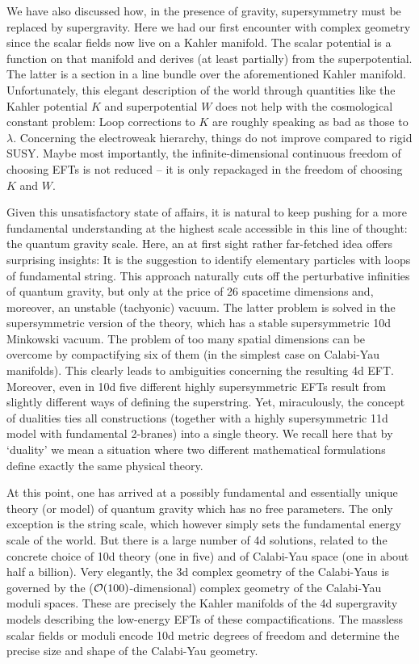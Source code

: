 \documentclass[12pt]{article}
\numberwithin{equation}{section}
\begin{document}
We have also discussed how, in the presence of gravity, supersymmetry must be replaced by supergravity. Here we had our first encounter with complex geometry since the scalar fields now live on a Kahler manifold. The scalar potential is a function on that manifold and derives (at least partially) from the superpotential. The latter is a section in a line bundle over the aforementioned Kahler manifold. Unfortunately, this elegant description of the world through quantities like the Kahler potential $K$ and superpotential $W$ does not help with the cosmological constant problem: Loop corrections to $K$ are roughly speaking as bad as those to $\lambda$. Concerning the electroweak hierarchy, things do not improve compared to rigid SUSY.
Maybe most importantly, the infinite-dimensional continuous freedom of choosing EFTs is not reduced -- it is only repackaged in the freedom of choosing $K$ and $W$.

Given this unsatisfactory state of affairs, it is natural to keep pushing for a more fundamental understanding at the highest scale accessible in this line of thought: the quantum gravity scale. Here, an at first sight rather far-fetched idea offers surprising insights: It is the suggestion to identify elementary particles with loops of fundamental string. This approach naturally cuts off the perturbative infinities of quantum gravity, but only at the price of 26 spacetime dimensions and, moreover, an unstable (tachyonic) vacuum. The latter problem is solved in the supersymmetric version of the theory, which has a stable supersymmetric 10d Minkowski vacuum. The problem of too many spatial dimensions can be overcome by compactifying six of them (in the simplest case on Calabi-Yau manifolds). This clearly leads to ambiguities concerning the resulting 4d EFT. Moreover, even in 10d five different highly supersymmetric EFTs result from slightly different ways of defining the superstring. Yet, miraculously, the concept of dualities ties all constructions (together with a highly supersymmetric 11d model with fundamental 2-branes) into a single theory.
We recall here that by `duality' we mean a situation where two different mathematical formulations define exactly the same physical theory.

At this point, one has arrived at a possibly fundamental and essentially unique theory (or model) of quantum gravity which has no free parameters. The only exception is the string scale, which however simply sets the fundamental energy scale of the world. But there is a large number of 4d solutions, related to the concrete choice of 10d theory (one in five) and of Calabi-Yau space (one in about half a billion). Very elegantly, the 3d complex geometry of the Calabi-Yaus is governed by the (${\cal O}(100)$-dimensional) complex geometry of the Calabi-Yau moduli spaces. These are precisely the Kahler manifolds of the 4d supergravity models describing the low-energy EFTs of these compactifications. The massless scalar fields or moduli encode 10d metric degrees of freedom and determine the precise size and shape of the Calabi-Yau geometry.
\end{document}
